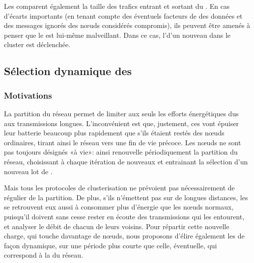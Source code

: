 Les \cns comparent également la taille des trafics entrant et sortant du \ch.
En cas d'écarts importants (en tenant compte des éventuels facteurs de  des données et des messages ignorés des nœuds considérés compromis), ils peuvent être amenés à penser que le \ch est lui-même malveillant.
Dans ce cas, l'\election d'un nouveau \CH dans le cluster est déclenchée.

    \subsection{Sélection dynamique des \cns}

        \subsubsection{Motivations}
La partition du réseau permet de limiter aux seuls \chs les efforts énergétiques dus aux transmissions longues.
L'inconvénient est que, justement, ces \CH vont épuiser leur batterie beaucoup plus rapidement que s'ils étaient restés des nœuds ordinaires, tirant ainsi le réseau vers une fin de vie précoce.
Les nœuds ne sont pas toujours désignés \CH «à vie»: ainsi \leach renouvelle périodiquement la partition du réseau, choisissant à chaque itération de nouveaux \chs et entrainant la sélection d'un nouveau lot de \cns.

Mais tous les protocoles de clusterisation ne prévoient pas nécessairement de  régulier de la partition.
De plus, s'ils n'émettent pas sur de longues distances, les \cns se retrouvent eux aussi à consommer plus d'énergie que les nœuds normaux, puisqu'il doivent sans cesse rester en écoute des transmissions qui les entourent, et analyser le débit de chacun de leurs voisins.
Pour répartir cette nouvelle charge, qui touche davantage de nœuds, nous proposons d'élire également les \cns de façon dynamique, sur une période plus courte que celle, éventuelle, qui correspond à la  du réseau.

